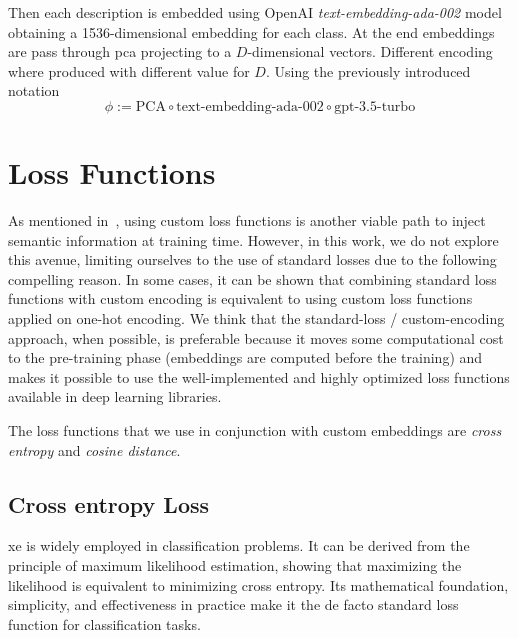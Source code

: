 \vspace{10pt}

Then each description is embedded using OpenAI \emph{text-embedding-ada-002}
model obtaining a 1536-dimensional embedding for each class. At the end
embeddings are pass through \acrshort{pca} projecting to a $D$-dimensional
vectors. Different encoding where produced with different value for $D$. Using
the previously introduced notation
\begin{equation}
  \phi := \textrm{PCA} \circ \textrm{text-embedding-ada-002} \circ
  \textrm{gpt-3.5-turbo}
  \label{eq:desc-pca}
\end{equation}



\section{Loss Functions}
\label{sec:losses}

As mentioned in~, using custom loss functions is
another viable path to inject semantic information at training time. However, in
this work, we do not explore this avenue, limiting ourselves to the use of
standard losses due to the following compelling reason. In some cases, it can be
shown that combining standard loss functions with custom encoding is equivalent
to using custom loss functions applied on one-hot encoding. We think that the
standard-loss / custom-encoding approach, when possible, is preferable because
it moves some computational cost to the pre-training phase (embeddings are
computed before the training) and makes it possible to use the well-implemented
and highly optimized loss functions available in deep learning libraries.

The loss functions that we use in conjunction with custom embeddings are
\emph{cross entropy} and \emph{cosine distance}.


\subsection{Cross entropy Loss}
\label{subsec:cross-entropy-loss}

\acrfull{xe} is widely employed in classification problems. It can be derived
from the principle of maximum likelihood estimation, showing that maximizing the
likelihood is equivalent to minimizing cross entropy. Its mathematical
foundation, simplicity, and effectiveness in practice make it the de facto
standard loss function for classification tasks.

